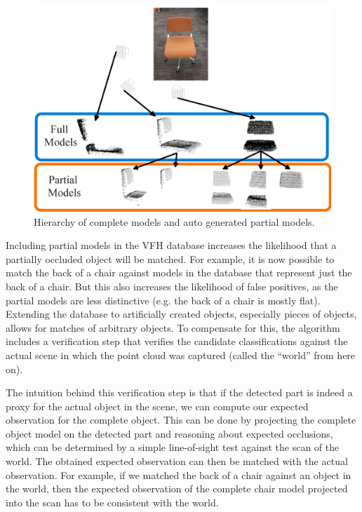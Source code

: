 \documentclass[letterpaper, 10pt, conference]{ieeeconf}
\def\figw{\columnwidth}
\begin{document}
\begin{figure}[t]
   \vspace{-10pt}
   \centering
   \includegraphics[width=\figw]{images/models.jpeg}
   \vspace{-10pt}
   \caption{Hierarchy of complete models and auto generated partial models.}
   \label{diagram}
   \vspace{-10pt}
\end{figure}

Including partial models in the VFH database increases the likelihood that a partially 
occluded object will be matched. For example, it is now possible to match the back of a 
chair against models in the database that represent just the back of a chair. But this also 
increases the likelihood of false positives, as the partial models are less distinctive 
(e.g. the back of a chair is mostly flat). 
Extending the database to artificially created objects, especially pieces of objects, 
allows for matches of arbitrary objects. To compensate for this, 
the algorithm includes a verification step that verifies the candidate classifications 
against the actual scene in which the point cloud was captured (called the ``world'' from here on).

The intuition behind this verification step is that if the detected part is
indeed a proxy for the actual object in the scene, we can compute our expected
observation for the complete object. This can be done by projecting the complete
object model on the detected part and reasoning about expected occlusions,
which can be determined by a simple line-of-sight test against the scan of the world. The obtained expected
observation can then be matched with the actual observation. For example, if we matched the back of a chair against an object in the world, then the expected observation of the complete chair model projected into the scan has to be
consistent with the world. 
\end{document}
